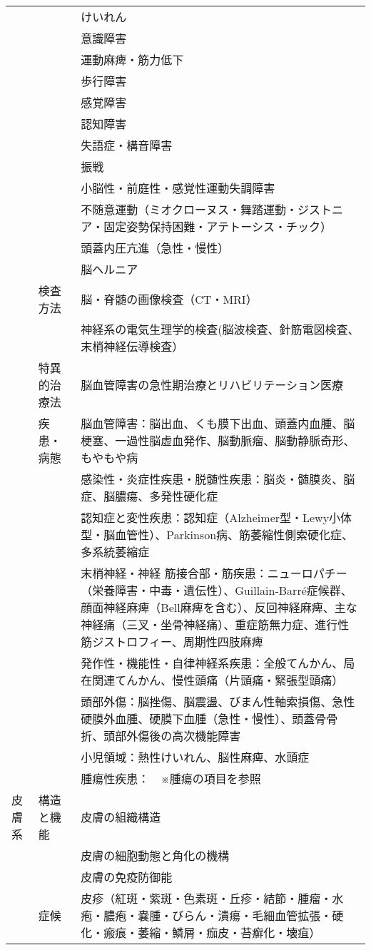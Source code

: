 \documentclass[
]{ltjsarticle}
\begin{document}
\begin{xltabular}{\linewidth}{XXX}
 &  & けいれん \\
 &  & 意識障害 \\
 &  & 運動麻痺・筋力低下 \\
 &  & 歩行障害 \\
 &  & 感覚障害 \\
 &  & 認知障害 \\
 &  & 失語症・構音障害 \\
 &  & 振戦 \\
 &  & 小脳性・前庭性・感覚性運動失調障害 \\
 &  & 不随意運動（ミオクローヌス・舞踏運動・ジストニア・固定姿勢保持困難・アテトーシス・チック） \\
 &  & 頭蓋内圧亢進（急性・慢性） \\
 &  & 脳ヘルニア \\
 & 検査方法 & 脳・脊髄の画像検査（CT・MRI） \\
 &  & 神経系の電気生理学的検査(脳波検査、針筋電図検査、末梢神経伝導検査） \\
 & 特異的治療法 & 脳血管障害の急性期治療とリハビリテーション医療 \\
 & 疾患・病態 & 脳血管障害：脳出血、くも膜下出血、頭蓋内血腫、脳梗塞、一過性脳虚血発作、脳動脈瘤、脳動静脈奇形、もやもや病 \\
 &  & 感染性・炎症性疾患・脱髄性疾患：脳炎・髄膜炎、脳症、脳膿瘍、多発性硬化症 \\
 &  & 認知症と変性疾患：認知症（Alzheimer型・Lewy小体型・脳血管性）、Parkinson病、筋萎縮性側索硬化症、多系統萎縮症 \\
 &  & 末梢神経・神経 筋接合部・筋疾患：ニューロパチー（栄養障害・中毒・遺伝性）、Guillain-Barré症候群、顔面神経麻痺（Bell麻痺を含む）、反回神経麻痺、主な神経痛（三叉・坐骨神経痛）、重症筋無力症、進行性筋ジストロフィー、周期性四肢麻痺 \\
 &  & 発作性・機能性・自律神経系疾患：全般てんかん、局在関連てんかん、慢性頭痛（片頭痛・緊張型頭痛） \\
 &  & 頭部外傷：脳挫傷、脳震盪、びまん性軸索損傷、急性硬膜外血腫、硬膜下血腫（急性・慢性）、頭蓋骨骨折、頭部外傷後の高次機能障害 \\
 &  & 小児領域：熱性けいれん、脳性麻痺、水頭症 \\
 &  & 腫瘍性疾患：　※腫瘍の項目を参照 \\
皮膚系 & 構造と機能 & 皮膚の組織構造 \\
 &  & 皮膚の細胞動態と角化の機構 \\
 &  & 皮膚の免疫防御能 \\
 & 症候 & 皮疹（紅斑・紫斑・色素斑・丘疹・結節・腫瘤・水疱・膿疱・嚢腫・びらん・潰瘍・毛細血管拡張・硬化・瘢痕・萎縮・鱗屑・痂皮・苔癬化・壊疽） \\

\end{xltabular}
\end{document}
